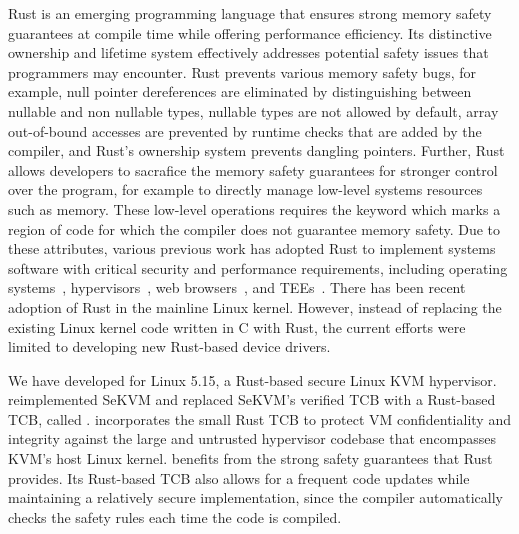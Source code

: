 Rust is an emerging programming language that ensures strong memory safety
guarantees at compile time while offering performance efficiency.
Its distinctive ownership and lifetime system
effectively addresses potential safety issues that programmers may encounter.
Rust prevents various memory safety bugs, for example, null pointer
dereferences are eliminated by distinguishing between nullable and non
nullable types, nullable types are not allowed by default, array out-of-bound
accesses are prevented by runtime checks that are added by the compiler, and
Rust's ownership system prevents dangling pointers.
Further, Rust allows developers to
sacrafice the memory safety guarantees for stronger control over the program,
for example to directly manage low-level systems resources such as memory.
These low-level operations requires the  keyword which marks a
region of code for which the compiler does not guarantee memory safety.
Due to these
attributes, various previous work has adopted Rust to implement systems
software with critical security and performance requirements, including
operating systems~\cite{NrOS, Redleaf, TockOS, theseus},
hypervisors~\cite{DuVisor, RustyHermit}, web browsers~\cite{servo},
and TEEs~\cite{rustsgx,rustee}.
There has been recent adoption of Rust in the mainline Linux kernel. However,
instead of replacing the existing Linux kernel code written in C with Rust,
the current efforts were limited to developing new Rust-based device drivers.

We have developed \rustsec{} for Linux 5.15, a Rust-based secure Linux KVM hypervisor.
\rustsec{} reimplemented SeKVM \cite{sekvm} and replaced SeKVM's verified TCB
with a Rust-based TCB, called \rustcore{}.
\rustsec{} incorporates the small Rust TCB \rustcore{} to
protect VM confidentiality and integrity against the large and untrusted
hypervisor codebase that encompasses KVM’s host Linux kernel.
\rustsec{} benefits from the strong safety guarantees that Rust provides.
Its Rust-based TCB also allows for a frequent code updates while maintaining a
relatively secure implementation, since the compiler automatically checks the
safety rules each time the code is compiled.

